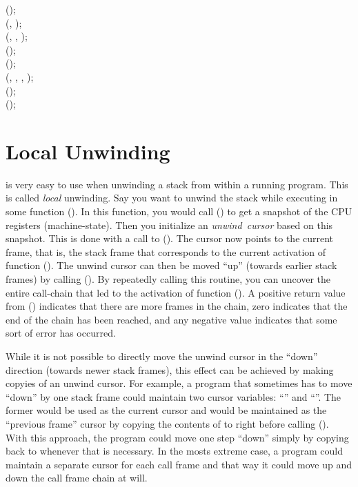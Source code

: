 \documentclass{article}
\begin{document}
\noindent
{}();\\
\noindent
{} (, );\\
\noindent
{} (, , );\\
\noindent
{} ();\\
 ();\\
\noindent
{} (, , , );\\

\noindent
{} ();\\
\noindent
{} ();\\

\section{Local Unwinding}

 is very easy to use when unwinding a stack from
within a running program.  This is called \emph{local} unwinding.  Say
you want to unwind the stack while executing in some function
().  In this function, you would call ()
to get a snapshot of the CPU registers (machine-state).  Then you
initialize an \emph{unwind~cursor} based on this snapshot.  This is
done with a call to ().  The cursor now points
to the current frame, that is, the stack frame that corresponds to the
current activation of function ().  The unwind cursor can then
be moved ``up'' (towards earlier stack frames) by calling
().  By repeatedly calling this routine, you can
uncover the entire call-chain that led to the activation of function
().  A positive return value from () indicates
that there are more frames in the chain, zero indicates that the end
of the chain has been reached, and any negative value indicates that
some sort of error has occurred.

While it is not possible to directly move the unwind cursor in the
``down'' direction (towards newer stack frames), this effect can be
achieved by making copyies of an unwind cursor.  For example, a
program that sometimes has to move ``down'' by one stack frame could
maintain two cursor variables: ``'' and ``''.  The
former would be used as the current cursor and  would be
maintained as the ``previous frame'' cursor by copying the contents of
 to  right before calling ().
With this approach, the program could move one step ``down'' simply by
copying back  to  whenever that is necessary.  In
the mosts extreme case, a program could maintain a separate cursor for
each call frame and that way it could move up and down the call frame
chain at will.
\end{document}
